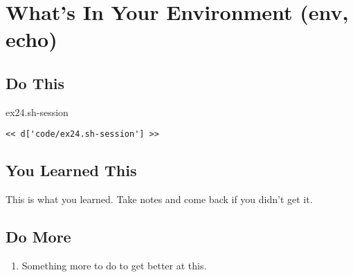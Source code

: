 \chapter{What's In Your Environment (env, echo)}

\section{Do This}

\begin{code}{ex24.sh-session}
\begin{Verbatim}
<< d['code/ex24.sh-session'] >>
\end{Verbatim}
\end{code}


\section{You Learned This}

This is what you learned.  Take notes and come back if you didn't get it.

\section{Do More}

\begin{enumerate}
\item Something more to do to get better at this.
\end{enumerate}

